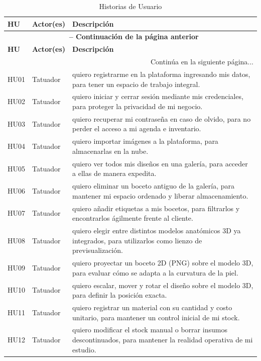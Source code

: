 \begin{longtable}{|l|p{3.5cm}|p{9.5cm}|}
  \caption{Historias de Usuario} \label{tab:hu}\\
  \hline
  \textbf{HU} & \textbf{Actor(es)} & \textbf{Descripción} \\
  \hline
  \endfirsthead
  \multicolumn{3}{c}{\textbf{\tablename\ \thetable{} -- Continuación de la página anterior}} \\
  \hline
  \textbf{HU} & \textbf{Actor(es)} & \textbf{Descripción} \\
  \hline
  \endhead
  \hline
  \multicolumn{3}{|r|}{Continúa en la siguiente página...} \\
  \hline
  \endfoot
  \hline
  \endlastfoot
  HU01 & Tatuador & quiero registrarme en la plataforma ingresando mis datos, para tener un espacio de trabajo integral. \\ \hline
  HU02 & Tatuador & quiero iniciar y cerrar sesión mediante mis credenciales, para proteger la privacidad de mi negocio. \\ \hline
  HU03 & Tatuador & quiero recuperar mi contraseña en caso de olvido, para no perder el acceso a mi agenda e inventario. \\ \hline
  HU04 & Tatuador & quiero importar imágenes a la plataforma, para almacenarlas en la nube. \\ \hline
  HU05 & Tatuador & quiero ver todos mis diseños en una galería, para acceder a ellas de manera expedita. \\ \hline
  HU06 & Tatuador & quiero eliminar un boceto antiguo de la galería, para mantener mi espacio ordenado y liberar almacenamiento. \\ \hline
  HU07 & Tatuador & quiero añadir etiquetas a mis bocetos, para filtrarlos y encontrarlos ágilmente frente al cliente. \\ \hline
  HU08 & Tatuador & quiero elegir entre distintos modelos anatómicos 3D ya integrados, para utilizarlos como lienzo de previsualización. \\ \hline
  HU09 & Tatuador & quiero proyectar un boceto 2D (PNG) sobre el modelo 3D, para evaluar cómo se adapta a la curvatura de la piel. \\ \hline
  HU10 & Tatuador & quiero escalar, mover y rotar el diseño sobre el modelo 3D, para definir la posición exacta. \\ \hline
  HU11 & Tatuador & quiero registrar un material con su cantidad y costo unitario, para mantener un control inicial de mi stock. \\ \hline
  HU12 & Tatuador & quiero modificar el stock manual o borrar insumos descontinuados, para mantener la realidad operativa de mi estudio. \\ \hline

\end{longtable}
